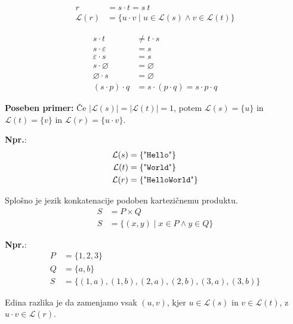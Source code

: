 \documentclass{report}
\newcommand{\Ex}{\textbf{Npr.}:\ }
\newcommand{\Special}[1]{\textbf{#1}}
\newcommand{\Empty}{\varnothing}
\newcommand{\Null}{\varepsilon}
\newcommand{\Language}[1]{\mathcal{L}(#1)}
\newcommand{\Str}[1]{\text{\textquotedbl\texttt{#1}\textquotedbl}}
\newcommand{\Seq}{\cdot}
\newcommand{\Spc}{\ }
\begin{document}
\begin{tcolorbox}[title={Definicija}]
\begin{equation*}
  \begin{aligned}
  r &= s \Seq t = s \Spc t\\
  \Language{r} &= \{ u \Seq v \mid u \in \Language{s} \land v \in \Language{t}\}
  \end{aligned}
\end{equation*}
\end{tcolorbox}

\begin{tcolorbox}[title={Pravila}]
\begin{equation*}
  \begin{aligned}
  s \Seq t &\not= t \Seq s\\
  s \Seq \Null &= s \\
  \Null \Seq s &= s   \\
  s \Seq \Empty &= \Empty \\
  \Empty \Seq s &= \Empty \\
  (s \Seq p) \Seq q &= s \Seq (p \Seq q) = s \Seq p \Seq q
  \end{aligned}
\end{equation*}
\end{tcolorbox}

\vspace{1em}
\Special{Poseben primer:} Če $|\Language{s}| = |\Language{t}| = 1$, potem $\Language{s} = \{u\}$ in $\Language{t} = \{v\}$ in $\Language{r} = \{u \Seq v\}$.

\Ex
\begin{align*}
  \Language{s} &= \{\Str{Hello}\}\\
  \Language{t} &= \{\Str{World}\}\\
  \Language{r} &= \{\Str{HelloWorld}\}
\end{align*}

Splošno je jezik konkatenacije podoben kartezičnemu produktu.
\begin{align*}
  S &= P \times Q \\
  S &= \{ (x, y) \mid x \in P \land y \in Q\}
\end{align*}

\Ex
\begin{align*}
  P &= \{1, 2, 3\}\\
  Q &= \{a, b\}\\
  S &= \{(1, a), (1, b), (2, a), (2, b), (3, a), (3, b) \}
\end{align*}

Edina razlika je da zamenjamo vsak $(u, v)$, kjer $u \in \Language{s}$ in $v\in \Language{t}$, z $u \Seq v \in \Language{r}$.
\end{document}
